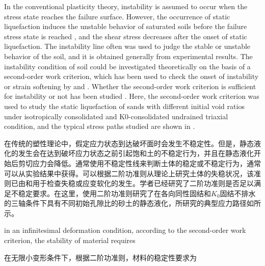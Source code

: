 \begin{ParaColumn}
    
    In the conventional plasticity theory, instability is assumed to occur when the stress state reaches the failure surface. However, the occurrence of static liquefaction induces the unstable behavior of saturated soils before the failure stress state is reached \citep{Daouadji2010}, and the shear stress decreases after the onset of static liquefaction. The instability line often was used to judge the stable or unstable behavior of the soil, and it is obtained generally from experimental results. The instability condition of soil could be investigated theoretically on the basis of a second-order work criterion, which has been used to check the onset of instability or strain softening by \citet{Valanis1985} and \citet{Chu1992}. Whether the second-order work criterion is sufficient for instability or not has been studied \citep{Lade1987, Lade1988, Chu1993, Chu2009}. Here, the second-order work criterion was used to study the static liquefaction of sands with different initial void ratios under isotropically consolidated and K0-consolidated undrained triaxial condition, and the typical stress paths studied are shown in .

    \switchcolumn

    在传统的塑性理论中，假定应力状态到达破坏面时会发生不稳定性。但是，静态液化的发生会在达到破坏应力状态之前引起饱和土的不稳定行为\citep{Daouadji2010}，并且在静态液化开始后剪切应力会降低。通常使用不稳定性线来判断土体的稳定或不稳定行为，通常可以从实验结果中获得。可以根据二阶功准则从理论上研究土体的失稳状况，该准则已由\citet{Valanis1985}和\citet{Chu1992}用于检查失稳或应变软化的发生。学者已经研究了二阶功准则是否足以满足不稳定要求\citep{Lade1987, Lade1988, Chu1993, Chu2009}。在这里，使用二阶功准则研究了在各向同性固结和$K_0$固结不排水的三轴条件下具有不同初始孔隙比的砂土的静态液化，所研究的典型应力路径如所示。

    \CrossColumnText{
        
    }
    \switchcolumn*

    in an infinitesimal deformation condition, according to the second-order work criterion, the stability of material requires

    \switchcolumn

    在无限小变形条件下，根据二阶功准则，材料的稳定性要求为

    \switchcolumn*


\end{ParaColumn}
